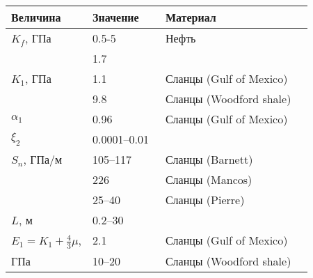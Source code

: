 \begin{table} [htbp]%
    \centering
    \caption{}%
    \label{tab:coef1}%
    \renewcommand{\arraystretch}{1.5}%
    \begin{SingleSpace}
        \begin{tabular}{@{}@{\extracolsep{20pt}}llll@{}} %
            \toprule     %
            Величина & Значение & Материал \\
            \midrule %
            $K_f$, ГПа          & 0.5-5~\autocite{craft1959petroleum}         & Нефть   \\
                                &    1.7~\autocite{abousleiman2005poromechanics}        &   \\
            \midrule
            $K_1$, ГПа          & 1.1~\autocite{abousleiman2005poromechanics}           & Сланцы (Gulf of Mexico)    \\
                                &    9.8~\autocite{abousleiman2007geomechanics}        &  Сланцы (Woodford shale) \\
            \midrule
            $\alpha_1$          & 0.96~\autocite{abousleiman2005poromechanics}          & Сланцы (Gulf of Mexico)   \\
            $\xi_2$             & 0.0001–0.01~\autocite{snow1968rock}  &   \\
            \midrule
            $S_n$, ГПа/м                  &    105–117~\autocite{ye2016fracture}      &  Сланцы (Barnett) \\
                                &    226~\autocite{ye2016fracture}       &  Сланцы (Mancos) \\
                                &    25–40~\autocite{ye2016fracture}        &  Сланцы (Pierre) \\
                                \midrule
            $L$, м                    &    0.2–30~\autocite{snow1968rock}        &   \\
            \midrule
            $E_1 = K_1 + \frac{4}{3}\mu $,                     &    2.1~\autocite{abousleiman2005poromechanics}        &  Сланцы (Gulf of Mexico) \\
            ГПа                    &    10–20         &  Сланцы (Woodford shale) \\

\end{tabular}
\end{SingleSpace}
\end{table}
